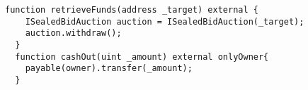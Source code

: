 \begin{lstlisting}[language=Solidity]
  function retrieveFunds(address _target) external {
	ISealedBidAuction auction = ISealedBidAuction(_target);
	auction.withdraw();
  }
  function cashOut(uint _amount) external onlyOwner{
    payable(owner).transfer(_amount);
  }
\end{lstlisting}